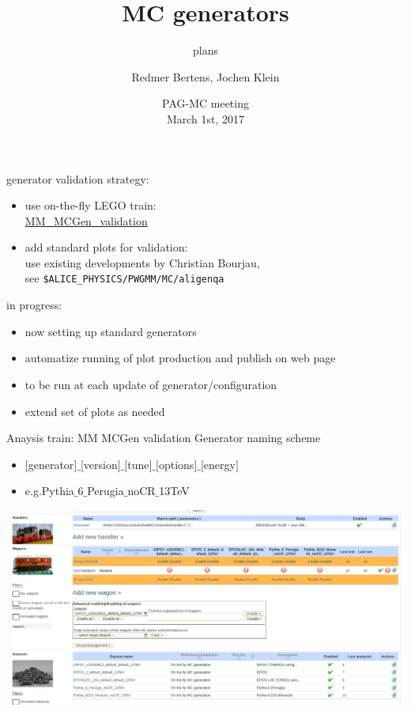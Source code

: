 \documentclass[table]{beamer}
\title{MC generators}
\subtitle{plans}
\author[Redmer, jkl]{Redmer Bertens\inst{1}, Jochen Klein\inst{2}}
\institute[]{
  \inst{1} University of Tennessee, Knoxville \and
  \inst{2} CERN, Geneva
}
\date[PAG-MC meeting, Mar 1, 2017]{
  PAG-MC meeting\\[.2cm]
  March 1st, 2017
}
\begin{document}
{
  \begin{frame}
    \titlepage
  \end{frame}
}

\begin{frame}{generator validation}
  strategy:
  \begin{itemize}
    \setlength{\itemsep}{.25cm}
  \item use on-the-fly LEGO train:\\
    \href{https://alimonitor.cern.ch/trains/train.jsp?train_id=107}{MM\_MCGen\_validation}
  \item add standard plots for validation:\\[.2cm]
    use existing developments by Christian Bourjau,\\
    see \texttt{\$ALICE\_PHYSICS/PWGMM/MC/aligenqa}
  \end{itemize}
  \vspace{.25cm}
  in progress:
  \begin{itemize}
    \setlength{\itemsep}{.25cm}
  \item now setting up standard generators
  \item automatize running of plot production and publish on web page
  \item to be run at each update of generator/configuration
  \item extend set of plots as needed
  \end{itemize}
\end{frame}

\begin{frame}{Anaysis train: MM MCGen validation}
Generator naming scheme
\begin{itemize}
    \item $[$generator$]\_[$version$]\_[$tune$]\_[$options$]\_[$energy$]$
        \item e.g.Pythia$\_$6$\_$Perugia$\_$noCR$\_$13TeV
\end{itemize}
\includegraphics[width=\textwidth]{../fig/pwg_mm_lego_train.png}
\end{frame}
\end{document}
